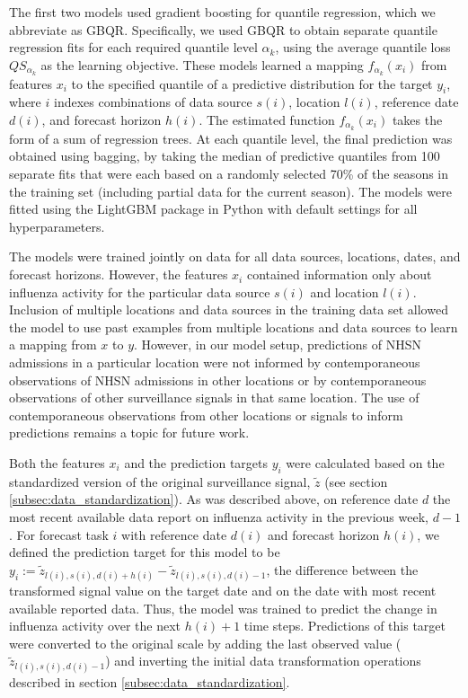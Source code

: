 \documentclass{article}\usepackage[]{graphicx}\usepackage[]{xcolor}
\begin{document}
The first two models used gradient boosting for quantile regression, which we abbreviate as GBQR.
Specifically, we used GBQR to obtain separate quantile regression fits for each required quantile level $\alpha_k$, using the average quantile loss $QS_{\alpha_k}$ as the learning objective.
These models learned a mapping $f_{\alpha_k}(x_i)$ from features $x_i$ to the specified quantile of a predictive distribution for the target $y_i$, where $i$ indexes combinations of data source $s(i)$, location $l(i)$, reference date $d(i)$, and forecast horizon $h(i)$.  The estimated function $f_{\alpha_k}(x_i)$ takes the form of a sum of regression trees.  At each quantile level, the final prediction was obtained using bagging, by taking the median of predictive quantiles from 100 separate fits that were each based on a randomly selected 70\% of the seasons in the training set (including partial data for the current season).  The models were fitted using the LightGBM package in Python \cite{ke2017lightgbm} with default settings for all hyperparameters.

The models were trained jointly on data for all data sources, locations, dates, and forecast horizons.  However, the features $x_i$ contained information only about influenza activity for the particular data source $s(i)$ and location $l(i)$. Inclusion of multiple locations and data sources in the training data set allowed the model to use past examples from multiple locations and data sources to learn a mapping from $x$ to $y$. However, in our model setup, predictions of NHSN admissions in a particular location were not informed by contemporaneous observations of NHSN admissions in other locations or by contemporaneous observations of other surveillance signals in that same location. The use of contemporaneous observations from other locations or signals to inform predictions remains a topic for future work.

Both the features $x_i$ and the prediction targets $y_i$ were calculated based on the standardized version of the original surveillance signal, $\tilde{z}$ (see section \ref{subsec:data_standardization}).
As was described above, on reference date $d$ the most recent available data report on influenza activity in the previous week, $d-1$.
For forecast task $i$ with reference date $d(i)$ and forecast horizon $h(i)$, we defined the prediction target for this model to be $y_i := \tilde{z}_{l(i), s(i), d(i) + h(i)} - \tilde{z}_{l(i), s(i), d(i) - 1}$, the difference between the transformed signal value on the target date and on the date with most recent available reported data.
Thus, the model was trained to predict the change in influenza activity over the next $h(i) + 1$ time steps.
Predictions of this target were converted to the original scale by adding the last observed value ($\tilde{z}_{l(i), s(i), d(i) - 1}$) and inverting the initial data transformation operations described in section \ref{subsec:data_standardization}.
\end{document}
